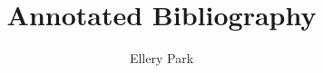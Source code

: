 \documentclass[12pt]{article}
\title{\textbf{Annotated Bibliography}}
\author{Ellery Park}
\begin{document}
\maketitle


\nocite{*}



\end{document}
